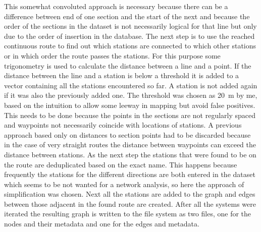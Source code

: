 This somewhat convoluted approach is necessary because there can be a difference between end of one section and the start of the next and because the order of the sections in the dataset is not necessarily logical for that line but only due to the order of insertion in the database.
The next step is to use the reached continuous route to find out which stations are connected to which other stations or in which order the route passes the stations.
For this purpose some trigonometry is used to calculate the distance between a line and a point.
If the distance between the line and a station is below a threshold it is added to a vector containing all the stations encountered so far.
A station is not added again if it was also the previously added one.
The threshold was chosen as \SI{20}{\meter} by me, based on the intuition to allow some leeway in mapping but avoid false positives.
This needs to be done because the points in the sections are not regularly spaced and waypoints not necessarily coincide with locations of stations.
A previous approach based only on distances to section points had to be discarded because in the case of very straight routes the distance between waypoints can exceed the distance between stations.
As the next step the stations that were found to be on the route are deduplicated based on the exact name.
This happens because frequently the stations for the different directions are both entered in the dataset which seems to be not wanted for a network analysis, so here the approach of simplification was chosen.
Next all the stations are added to the graph and edges between those adjacent in the found route are created.
After all the systems were iterated the resulting graph is written to the file system as two files, one for the nodes and their metadata and one for the edges and metadata.

